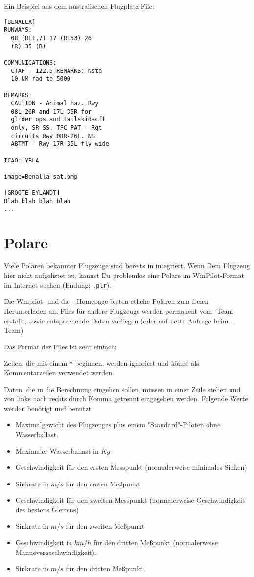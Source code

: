 {{{{Ein Beispiel aus dem australischen Flugplatz-File:
\begin{verbatim}
[BENALLA]
RUNWAYS:
  08 (RL1,7) 17 (RL53) 26
  (R) 35 (R)

COMMUNICATIONS:
  CTAF - 122.5 REMARKS: Nstd
  10 NM rad to 5000'

REMARKS:
  CAUTION - Animal haz. Rwy
  08L-26R and 17L-35R for
  glider ops and tailskidacft
  only, SR-SS. TFC PAT - Rgt
  circuits Rwy 08R-26L. NS
  ABTMT - Rwy 17R-35L fly wide

ICAO: YBLA

image=Benalla_sat.bmp

[GROOTE EYLANDT]
Blah blah blah blah
...
\end{verbatim}


\section{Polare}\label{sec:glide-polar}

Viele Polaren bekannter Flugzeuge sind bereits in \xc integriert.  Wenn Dein Flugzeug  hier nicht
aufgelistet ist, kannst Du problemlos eine Polare im {\sc WinPilot}-Format im Internet suchen (Endung:
\verb|.plr|).

Die Winpilot- und die \xc - Homepage bieten etliche Polaren zum freien Herunterladen an. Files für
andere Flugzeuge werden permanent vom \xc-Team erstellt, sowie entsprechende Daten vorliegen (oder
auf nette Anfrage beim \xc-Team)

Das Format der Files ist sehr einfach:

Zeilen, die mit einem \verb|*| beginnen, werden ignoriert und könne als Kommentarzeilen verwendet
werden.

Daten, die in die Berechnung eingehen sollen, müssen in einer Zeile stehen und von links nach rechts durch
Komma getrennt eingegeben werden. Folgende Werte werden benötigt und benutzt:

\begin{itemize}
\item Maximalgewicht des Flugzeuges  plus einem "Standard"-Piloten ohne Wasserballast.
\item Maximaler Wasserballast in $Kg$
\item Geschwindigkeit für den ersten Messpunkt (normalerweise minimales Sinken)
\item Sinkrate in $m/s$ für den ersten Meßpunkt
\item Geschwindigkeit für den zweiten  Messpunkt (normalerweise Geschwindigkeit des bestens
    Gleitens)
\item Sinkrate in $m/s$ für den zweiten Meßpunkt
\item Geschwindigkeit in $km/h$ für den dritten Meßpunkt  (normalerweise Mannövergeschwindigkeit).
\item Sinkrate in $m/s$ für den dritten Meßpunkt
\end{itemize}

}}}}
